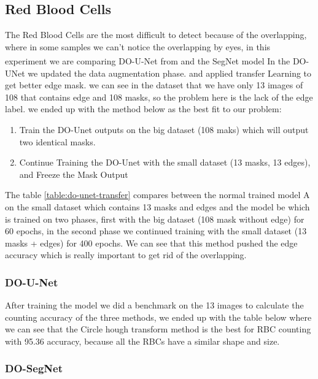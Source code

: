 \subsection{Red Blood Cells}
The Red Blood Cells are the most difficult to detect because of the overlapping, where in some samples we can't notice the overlapping by eyes, in this experiment we are comparing DO-U-Net from \textsuperscript{\cite{10.1007/978-3-030-44584-3_31}} and the SegNet model
In the DO-UNet we updated the data augmentation phase. and applied transfer Learning to get better edge mask. we can see in the dataset that we have only 13 images of 108 that contains edge and 108 masks, so the problem here is the lack of the edge label. we ended up with the method below as the best fit to our problem:
\begin{enumerate}
    \item Train the DO-Unet outputs on the big dataset (108 maks) which will output two identical masks.
    \item Continue Training the DO-Unet with the small dataset (13 masks, 13 edges), and Freeze the Mask Output
\end{enumerate}



The table \ref{table:do-unet-transfer} compares between the normal trained model A on the small dataset which contains 13 masks and edges and the model be which is trained on two phases, first with the big dataset (108 mask without edge) for 60 epochs, in the second phase we continued training with the small dataset (13 masks + edges) for 400 epochs.
We can see that this method pushed the edge accuracy which is really important to get rid of the overlapping.


\subsubsection{DO-U-Net}
After training the model we did a benchmark on the 13 images to calculate the counting accuracy of the three methods, we ended up with the table below where we can see that the Circle hough transform method is the best for RBC counting with 95.36 accuracy, because all the RBCs have a similar shape and size.




\subsubsection{DO-SegNet}


